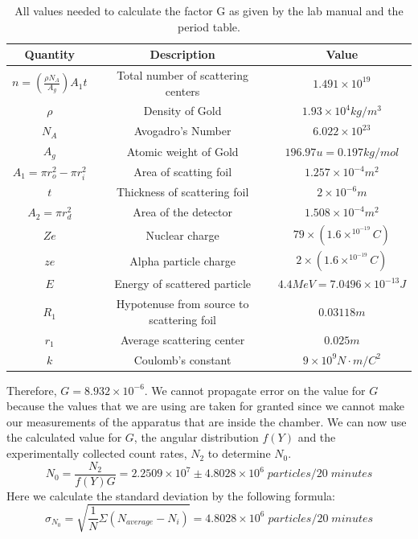 \begin{table}[H]
\begin{center}
\begin{tabular}{|c|c|c|}\hline
Quantity & Description & Value\\ \hline
 $n=\left(\frac{\rho N_A}{A_g}\right)A_1 t$ & Total number of scattering centers& $1.491\times10^{19}$ \\ \hline
 $\rho$ & Density of Gold &$1.93\times10^4 kg/m^3$ \\ \hline
$N_A$ & Avogadro's Number &  $6.022\times10^{23}$\\ \hline
$A_g$ & Atomic weight of Gold & $196.97 u= 0.197 kg/mol$ \\ \hline
$A_1=\pi r_o^2-\pi r_i^2 $ & Area of scatting foil& $1.257\times10^{-4} m^2$ \\ \hline
 $t$ & Thickness of scattering foil & $2\times10^{-6} m$\\ \hline
$A_2=\pi r_d^2$ & Area of the detector & $1.508\times10^{-4}m^2$\\ \hline
$Ze$ & Nuclear charge &$79\times (1.6\times^10^{-19} C)$\\ \hline
$ze$ & Alpha particle charge & $2\times(1.6\times^10^{-19} C)$\\ \hline
$E$ & Energy of scattered particle &$4.4MeV=7.0496\times10^{-13}J$\\ \hline
$R_1$ & Hypotenuse from source to scattering foil& $0.03118m$\\ \hline
$r_1$ & Average scattering center & $0.025 m$ \\ \hline
$k$ & Coulomb's constant & $9\times10^9 N\cdot m/ C^2$\\ \hline

\end{tabular}
\caption{All values needed to calculate the factor G as given by the lab manual and the period table.}
\end{center}
\end{table}
Therefore, $G=8.932\times10^{-6}$. We cannot propagate error on the value for $G$ because the values that we are using are taken for granted since we cannot make our measurements of the apparatus that are inside the chamber. We can now use the calculated value for $G$, the angular distribution $f(Y)$ and the experimentally collected count rates, $N_2$ to determine $N_0$. 
\begin{equation} N_0=\frac{N_2}{f(Y)G}= 2.2509\times10^7\pm4.8028\times10^6\;particles/20\;minutes\end{equation} 
Here we calculate the standard deviation by the following formula:
\begin{equation} \sigma_{N_0}=\sqrt{\frac{1}{N}\Sigma (N_{average} - N_i)}=4.8028\times10^6\;particles/20\;minutes\end{equation}


